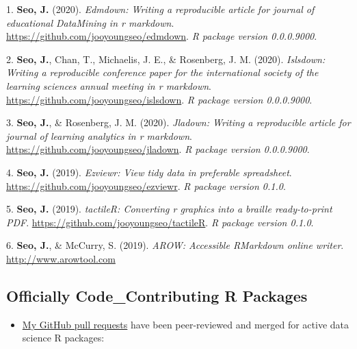 \documentclass[11pt,a4paper,]{awesome-cv}
\providecommand{\tightlist}{%
	\setlength{\itemsep}{0pt}\setlength{\parskip}{0pt}}
\newlength{\cslhangindent}
\newenvironment{CSLReferences}[2] %
 {\begin{list}{}{%
  \setlength{\itemindent}{0pt}
  \setlength{\leftmargin}{0pt}
  \setlength{\parsep}{0pt}
  \ifodd #1
   \setlength{\leftmargin}{\cslhangindent}
   \setlength{\itemindent}{-1\cslhangindent}
  \fi
  \setlength{\itemsep}{#2\baselineskip}}}
 {\end{list}}
\begin{document}
\label{refs-2061fa253ba446d2f8d9d3810e4746e6}
\begin{CSLReferences}{1}{0}
1. \textbf{Seo, J.} (2020). \emph{Edmdown: Writing a reproducible
article for journal of educational DataMining in r markdown}.
\url{https://github.com/jooyoungseo/edmdown}. \emph{R package version
0.0.0.9000}.

2. \textbf{Seo, J.}, Chan, T., Michaelis, J. E., \& Rosenberg, J. M.
(2020). \emph{Islsdown: Writing a reproducible conference paper for the
international society of the learning sciences annual meeting in r
markdown}. \url{https://github.com/jooyoungseo/islsdown}. \emph{R
package version 0.0.0.9000}.

3. \textbf{Seo, J.}, \& Rosenberg, J. M. (2020). \emph{Jladown: Writing
a reproducible article for journal of learning analytics in r markdown}.
\url{https://github.com/jooyoungseo/jladown}. \emph{R package version
0.0.0.9000}.

4. \textbf{Seo, J.} (2019). \emph{Ezviewr: View tidy data in preferable
spreadsheet}. \url{https://github.com/jooyoungseo/ezviewr}. \emph{R
package version 0.1.0}.

5. \textbf{Seo, J.} (2019). \emph{tactileR: Converting r graphics into a
braille ready-to-print PDF}.
\url{https://github.com/jooyoungseo/tactileR}. \emph{R package version
0.1.0}.

6. \textbf{Seo, J.}, \& McCurry, S. (2019). \emph{AROW: Accessible
RMarkdown online writer}. \url{http://www.arowtool.com}

\end{CSLReferences}

\subsection{Officially Code\_Contributing R
Packages}\label{officially-code_contributing-r-packages-1}

\begin{itemize}
\tightlist
\item
  \href{https://github.com/pulls?q=is\%3Apr+author\%3Ajooyoungseo+archived\%3Afalse+is\%3Aclosed}{My
  GitHub pull requests} have been peer-reviewed and merged for active
  data science R packages:
\end{itemize}
\end{document}
